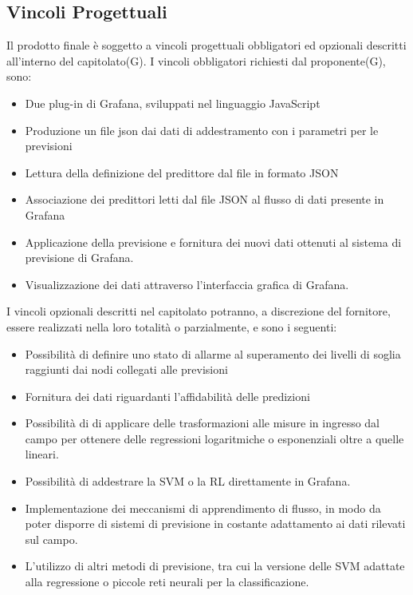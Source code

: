 	 \subsection{Vincoli Progettuali}
	 Il prodotto finale è soggetto a vincoli progettuali obbligatori ed opzionali descritti all’interno del capitolato(G). I vincoli obbligatori richiesti dal proponente(G), sono:

	 	\begin{itemize}
	 		\item Due plug-in di Grafana, sviluppati nel linguaggio JavaScript
	 		\item  Produzione un file json dai dati di addestramento con i parametri per le previsioni
			\item Lettura della definizione del predittore dal file in formato JSON
			\item Associazione dei predittori letti dal file JSON al flusso di dati presente in Grafana 
			\item Applicazione della previsione e fornitura dei nuovi dati ottenuti al sistema di previsione di Grafana.
			\item Visualizzazione dei dati attraverso l’interfaccia grafica di Grafana.
			
	 	\end{itemize}
	 	I vincoli opzionali descritti nel capitolato potranno, a discrezione del fornitore, essere realizzati nella loro totalità o parzialmente, e sono i seguenti:
		\begin{itemize}
			\item Possibilità di definire uno stato di allarme al superamento dei livelli di soglia raggiunti dai nodi collegati alle previsioni
			\item Fornitura dei dati riguardanti l’affidabilità delle predizioni
			\item Possibilità di di applicare delle trasformazioni alle misure in ingresso dal campo per ottenere delle regressioni logaritmiche o esponenziali oltre a quelle lineari.
			\item Possibilità di addestrare la SVM o la RL direttamente in Grafana.
			\item Implementazione dei meccanismi di apprendimento di flusso, in modo da poter disporre di sistemi di previsione in costante adattamento ai dati rilevati sul campo.
			\item L’utilizzo di altri metodi di previsione, tra cui la versione delle SVM adattate alla regressione o piccole reti neurali per la classificazione.

		\end{itemize}